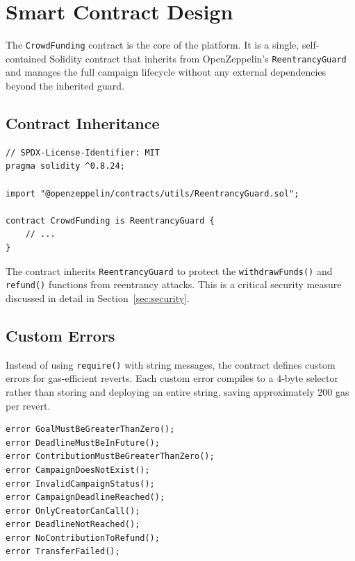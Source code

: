 \section{Smart Contract Design}
\label{sec:smartcontract}

The \texttt{CrowdFunding} contract is the core of the platform. It is a single, self-contained Solidity contract that inherits from OpenZeppelin's \texttt{ReentrancyGuard} and manages the full campaign lifecycle without any external dependencies beyond the inherited guard.

\subsection{Contract Inheritance}

\begin{lstlisting}[language=Solidity, caption={Contract Declaration}]
// SPDX-License-Identifier: MIT
pragma solidity ^0.8.24;

import "@openzeppelin/contracts/utils/ReentrancyGuard.sol";

contract CrowdFunding is ReentrancyGuard {
    // ...
}
\end{lstlisting}

The contract inherits \texttt{ReentrancyGuard} to protect the \texttt{withdrawFunds()} and \texttt{refund()} functions from reentrancy attacks. This is a critical security measure discussed in detail in Section~\ref{sec:security}.

\subsection{Custom Errors}

Instead of using \texttt{require()} with string messages, the contract defines custom errors for gas-efficient reverts. Each custom error compiles to a 4-byte selector rather than storing and deploying an entire string, saving approximately 200 gas per revert.

\begin{lstlisting}[language=Solidity, caption={Custom Error Definitions}]
error GoalMustBeGreaterThanZero();
error DeadlineMustBeInFuture();
error ContributionMustBeGreaterThanZero();
error CampaignDoesNotExist();
error InvalidCampaignStatus();
error CampaignDeadlineReached();
error OnlyCreatorCanCall();
error DeadlineNotReached();
error NoContributionToRefund();
error TransferFailed();
\end{lstlisting}

